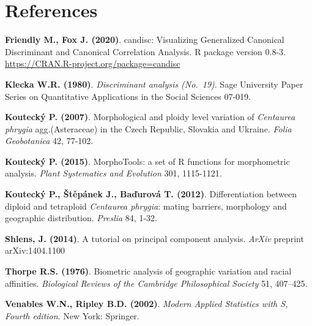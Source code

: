 \documentclass[
  11pt,
  a4paper]{article}
\begin{document}
\newpage

\hypertarget{references}{%
\section{References}\label{references}}

\textbf{Friendly M., Fox J. (2020)}. candisc: Visualizing Generalized
Canonical Discriminant and Canonical Correlation Analysis. R package
version 0.8-3. \url{https://CRAN.R-project.org/package=candisc}

\textbf{Klecka W.R. (1980)}. \emph{Discriminant analysis (No.~19)}. Sage
University Paper Series on Quantitative Applications in the Social
Sciences 07-019.

\textbf{Koutecký P. (2007)}. Morphological and ploidy level variation of
\emph{Centaurea phrygia} agg.(Asteraceae) in the Czech Republic,
Slovakia and Ukraine. \emph{Folia Geobotanica} 42, 77-102.

\textbf{Koutecký P. (2015)}. MorphoTools: a set of R functions for
morphometric analysis. \emph{Plant Systematics and Evolution} 301,
1115-1121.

\textbf{Koutecký P., Štěpánek J., Baďurová T. (2012)}. Differentiation
between diploid and tetraploid \emph{Centaurea phrygia}: mating
barriers, morphology and geographic distribution. \emph{Preslia} 84,
1-32.

\textbf{Shlens, J. (2014)}. A tutorial on principal component analysis.
\emph{ArXiv} preprint arXiv:1404.1100

\textbf{Thorpe R.S. (1976)}. Biometric analysis of geographic variation
and racial affinities. \emph{Biological Reviews of the Cambridge
Philosophical Society} 51, 407--425.

\textbf{Venables W.N., Ripley B.D. (2002)}. \emph{Modern Applied
Statistics with S, Fourth edition}. New York: Springer.
\end{document}
